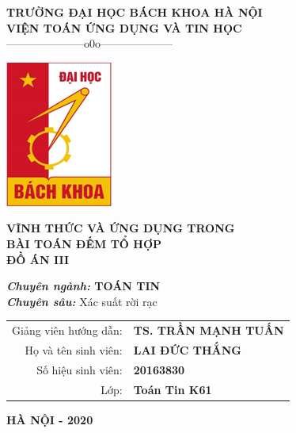 \documentclass[a4paper, 12pt]{report}
\begin{document}
	\begin{titlepage} %


			\begin{center}
				
				{\large\bf TRƯỜNG ĐẠI HỌC BÁCH KHOA HÀ NỘI}\\
				
				{\large\bf VIỆN TOÁN ỨNG DỤNG VÀ TIN HỌC} \\
				
				{———————o0o——————–}
				\vskip 1cm
				\begin{center}
     				\includegraphics[scale=.85]{biaDA.png}
				\end{center}
				\vskip 1cm
				

				{\Large\bf \textbf{VĨNH THỨC
						VÀ ỨNG DỤNG TRONG\\ BÀI TOÁN ĐẾM TỔ HỢP\\
				}}
				\vskip 1cm
				{\bf ĐỒ ÁN III}
				
				
				{\bf {\it Chuyên ngành:} TOÁN TIN}\\
				{\bf {\it Chuyên sâu:} }Xác suất rời rạc
				
				\vskip 1cm
				
				\begin{tabular}{r l}
					
					Giảng viên hướng dẫn:&{\bf TS. TRẦN MẠNH TUẤN }\\[0.5cm]
					
					Họ và tên sinh viên:&{\bf LAI ĐỨC THẮNG}\\[0.5cm]
					
					Số hiệu sinh viên:&{\bf 20163830}\\[0.5cm]
					Lớp:&{\bf Toán Tin K61}
					
				\end{tabular}
				
				\vfill
				
				{\bf HÀ NỘI - 2020}
				
			\end{center}
			
	\end{titlepage}
\end{document}
